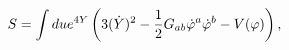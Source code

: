 \begin{equation}
S=\int du e^{4Y}\left ( 3({\dot Y})^2-{1\over 2}G_{ab}{\dot\varphi}^a
{\dot\varphi}^b -V(\varphi )\right ),
\label{KTl}\end{equation}

